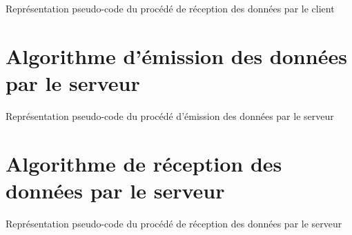 \begin{algorithm}[H]
	\KwResult{ - }
\caption{Représentation pseudo-code du procédé de réception des données par le client}
\end{algorithm}

\section{Algorithme d'émission des données par le serveur}

\begin{algorithm}[H]
	\KwResult{ - }
\caption{Représentation pseudo-code du procédé d'émission des données par le serveur}
\end{algorithm}

\section{Algorithme de réception des données par le serveur}

\begin{algorithm}[H]
	\KwResult{ - }
\caption{Représentation pseudo-code du procédé de réception des données par le serveur}
\end{algorithm}
\color{black}
